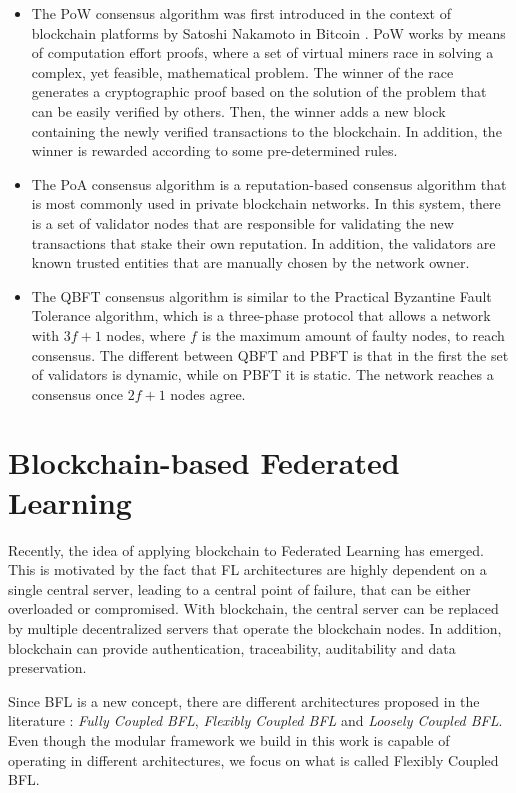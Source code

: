 \begin{itemize}
    \item The PoW consensus algorithm was first introduced in the context of blockchain platforms by Satoshi Nakamoto in Bitcoin \cite{nakamoto2009bitcoin}. PoW works by means of computation effort proofs, where a set of virtual miners race in solving a complex, yet feasible, mathematical problem. The winner of the race generates a cryptographic proof based on the solution of the problem that can be easily verified by others. Then, the winner adds a new block containing the newly verified transactions to the blockchain. In addition, the winner is rewarded according to some pre-determined rules.
    
    \item The PoA consensus algorithm is a reputation-based consensus algorithm that is most commonly used in private blockchain networks. In this system, there is a set of validator nodes that are responsible for validating the new transactions that stake their own reputation. In addition, the validators are known trusted entities that are manually chosen by the network owner.

    \item The QBFT \cite{10.48550/arxiv.2002.03613} consensus algorithm is similar to the Practical Byzantine Fault Tolerance algorithm, which is a three-phase protocol that allows a network with $3f+1$ nodes, where $f$ is the maximum amount of faulty nodes, to reach consensus. The different between QBFT and PBFT is that in the first the set of validators is dynamic, while on PBFT it is static. The network reaches a consensus once $2f+1$ nodes agree.
\end{itemize}

\section{Blockchain-based Federated Learning}\label{background:bfl}

Recently, the idea of applying blockchain to Federated Learning has emerged. This is motivated by the fact that FL architectures are highly dependent on a single central server, leading to a central point of failure, that can be either overloaded or compromised. With blockchain, the central server can be replaced by multiple decentralized servers that operate the blockchain nodes. In addition, blockchain can provide authentication, traceability, auditability and data preservation.

Since BFL is a new concept, there are different architectures proposed in the literature \cite{10.48550/arxiv.2110.02182}: \textit{Fully Coupled BFL}, \textit{Flexibly Coupled BFL} and \textit{Loosely Coupled BFL}. Even though the modular framework we build in this work is capable of operating in different architectures, we focus on what is called Flexibly Coupled BFL.


